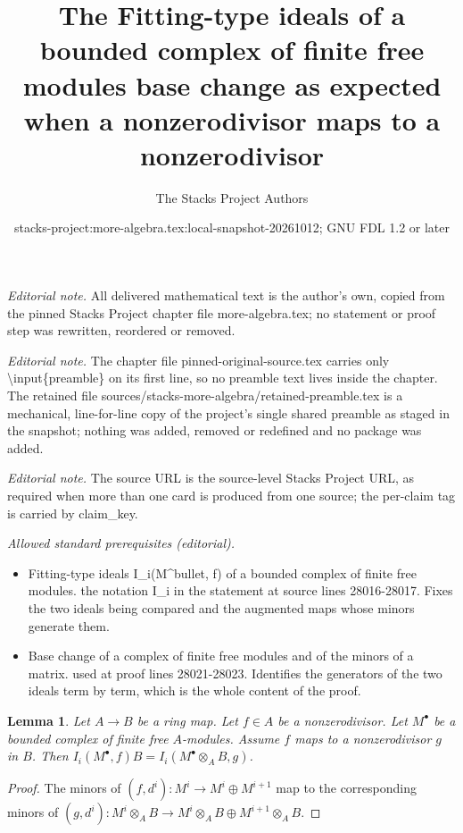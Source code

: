 \documentclass[10pt,a4paper]{amsart}
\title{The Fitting-type ideals of a bounded complex of finite free modules base change as expected when a nonzerodivisor maps to a nonzerodivisor}
\author{The Stacks Project Authors}
\date{stacks-project:more-algebra.tex:local-snapshot-20261012; GNU FDL 1.2 or later}
\theoremstyle{plain}
\newtheorem{lemma}[subsection]{Lemma}
\theoremstyle{definition}
\theoremstyle{remark}
\numberwithin{equation}{subsection}
\begin{document}
\maketitle
\setcounter{subsection}{1}
\noindent\textit{Editorial note.} All delivered mathematical text is the author's own, copied from the pinned Stacks Project chapter file more-algebra.tex; no statement or proof step was rewritten, reordered or removed.\par\medskip
\noindent\textit{Editorial note.} The chapter file pinned-original-source.tex carries only \textbackslash{}input\{preamble\} on its first line, so no preamble text lives inside the chapter. The retained file sources/stacks-more-algebra/retained-preamble.tex is a mechanical, line-for-line copy of the project's single shared preamble as staged in the snapshot; nothing was added, removed or redefined and no package was added.\par\medskip
\noindent\textit{Editorial note.} The source URL is the source-level Stacks Project URL, as required when more than one card is produced from one source; the per-claim tag is carried by claim\_key.\par\medskip
\noindent\textit{Allowed standard prerequisites (editorial).}\begin{itemize}
\item Fitting-type ideals I\_i(M\textasciicircum{}bullet, f) of a bounded complex of finite free modules. the notation I\_i in the statement at source lines 28016-28017. Fixes the two ideals being compared and the augmented maps whose minors generate them.
\item Base change of a complex of finite free modules and of the minors of a matrix. used at proof lines 28021-28023. Identifies the generators of the two ideals term by term, which is the whole content of the proof.
\end{itemize}\medskip
\begin{lemma}
\label{lemma-eta-base-change-pre}
Let $A \to B$ be a ring map. Let $f \in A$ be a nonzerodivisor. Let
$M^\bullet$ be a bounded complex of finite free $A$-modules. Assume
$f$ maps to a nonzerodivisor $g$ in $B$. Then
$I_i(M^\bullet, f)B = I_i(M^\bullet \otimes_A B, g)$.
\end{lemma}

\begin{proof}
The minors of $(f, d^i) : M^i \to M^i \oplus M^{i + 1}$ map to the
corresponding minors of
$(g, d^i) : M^i \otimes_A B \to M^i \otimes_A B \oplus M^{i + 1} \otimes_A B$.
\end{proof}
\end{document}
